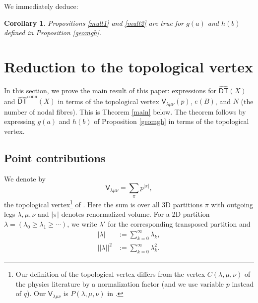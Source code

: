 \documentclass{amsart}
\newtheorem{corollary}[theorem]{Corollary}
\theoremstyle{definition}
\newcommand{\sfV}{\mathsf{V}}
\newcommand{\DT}{\mathsf{DT}}
\newcommand{\conn}{\operatorname{conn}}
\newcommand{\DThat}{\widehat{\DT}}
\begin{document}
We immediately deduce:  
\begin{corollary} 
Propositions \ref{mult1} and \ref{mult2} are true for $g(a)$ and $h(b)$ defined in Proposition \ref{geomgh}.
\end{corollary}   
   
   
\section{Reduction to the topological vertex}  \label{vertex} 

In this section, we prove the main result of this paper: expressions for $\DThat (X)$ and $\DThat ^{\conn}(X)$ in terms of the topological vertex $\sfV_{\lambda\mu\nu}(p)$, $e(B)$, and $N$ (the number of nodal fibres). This is Theorem \ref{main} below. The theorem follows by expressing $g(a)$ and $h(b)$ of Proposition \ref{geomgh} in terms of the topological vertex. 


\subsection{Point contributions}   

We denote by 
$$
\sfV_{\lambda\mu\nu} = \sum_{\pi} p^{|\pi|}, 
$$
the topological vertex\footnote{Our definition of the topological vertex differs from the vertex $C(\lambda,\mu,\nu)$ of the physics literature by a normalization factor (and we use variable $p$ instead of $q$). Our $\sfV_{\lambda\mu\nu}$ is $P(\lambda,\mu,\nu)$ in \cite[eqn.~3.16]{ORV}.} of \cite{ORV}.
Here the sum is over all 3D partitions $\pi$ with outgoing legs $\lambda, \mu, \nu$ and $|\pi|$ denotes renormalized volume. For a 2D partition $\lambda = (\lambda_0 \geq \lambda_1 \geq \cdots)$, we write $\lambda'$ for the corresponding transposed partition and 
\begin{align*}
|\lambda| &:= \sum_{k=0}^{\infty} \lambda_k, \\
|\!|\lambda|\!|^2 &:= \sum_{k=0}^{\infty} \lambda_{k}^{2}.
\end{align*}
\end{document}

